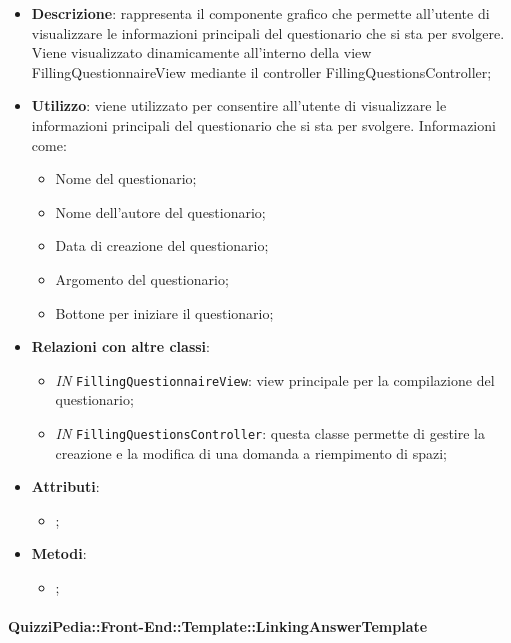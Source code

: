 		\begin{itemize}
			\item \textbf{Descrizione}: rappresenta il componente grafico che permette all'utente di visualizzare le informazioni principali del questionario che si sta per svolgere. Viene visualizzato dinamicamente all'interno della view FillingQuestionnaireView mediante il controller FillingQuestionsController;
			\item \textbf{Utilizzo}: viene utilizzato per consentire all'utente di visualizzare le informazioni principali del questionario che si sta per svolgere. Informazioni come:
			\begin{itemize}
				\item Nome del questionario;
				\item Nome dell'autore del questionario;
				\item Data di creazione del questionario;
				\item Argomento del questionario;
				\item Bottone per iniziare il questionario;
			\end{itemize}
			\item \textbf{Relazioni con altre classi}: 
			\begin{itemize}
				\item \textit{IN} \texttt{FillingQuestionnaireView}: view principale per la compilazione del questionario;
				\item \textit{IN} \texttt{FillingQuestionsController}: questa classe permette di gestire la creazione e la modifica di una domanda a riempimento di spazi;
			\end{itemize}
			\item \textbf{Attributi}: 
			\begin{itemize}
				\item ;
			\end{itemize}
			\item \textbf{Metodi}: 
			\begin{itemize}
				\item ;
			\end{itemize}
		\end{itemize}
		
		\paragraph{QuizziPedia::Front-End::Template::LinkingAnswerTemplate}
		
		\label{QuizziPedia::Front-End::Templates::LinkingAnswerTemplate}
		
